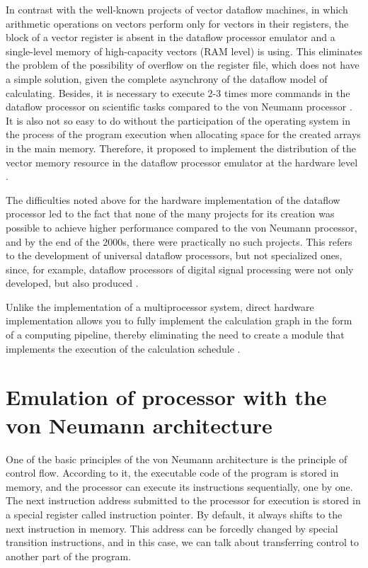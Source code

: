 \documentclass[
11pt,%
tightenlines,%
twoside,%
onecolumn,%
nofloats,%
nobibnotes,%
nofootinbib,%
superscriptaddress,%
noshowpacs,%
centertags]%
{revtex4}
\begin{document}
In contrast with the well-known projects of vector dataflow machines, in which arithmetic operations on vectors perform only for vectors in their registers, the block of a vector register is absent in the dataflow processor emulator and a single-level memory of high-capacity vectors (RAM level) is using.
This eliminates the problem of the possibility of overflow on the register file, which does not have a simple solution, given the complete asynchrony of the dataflow model of calculating.
Besides, it is necessary to execute 2-3 times more commands in the dataflow processor on scientific tasks compared to the von Neumann processor \cite{multithreading}.
It is also not so easy to do without the participation of the operating system in the process of the program execution when allocating space for the created arrays in the main memory.
Therefore, it proposed to implement the distribution of the vector memory resource in the dataflow processor emulator at the hardware level \cite{vpp}.

The difficulties noted above for the hardware implementation of the dataflow processor led to the fact that none of the many projects for its creation was possible to achieve higher performance compared to the von Neumann processor, and by the end of the 2000s, there were practically no such projects.
This refers to the development of universal dataflow processors, but not specialized ones, since, for example, dataflow processors of digital signal processing were not only developed, but also produced \cite{terada}.

Unlike the implementation of a multiprocessor system, direct hardware implementation allows you to fully implement the calculation graph in the form of a computing pipeline, thereby eliminating the need to create a module that implements the execution of the calculation schedule \cite{popov}.

\section{Emulation of processor with the von Neumann architecture}

One of the basic principles of the von Neumann architecture is the principle of control flow.
According to it, the executable code of the program is stored in memory, and the processor can execute its instructions sequentially, one by one.
The next instruction address submitted to the processor for execution is stored in a special register called instruction pointer.
By default, it always shifts to the next instruction in memory.
This address can be forcedly changed by special transition instructions, and in this case, we can talk about transferring control to another part of the program.
\end{document}
